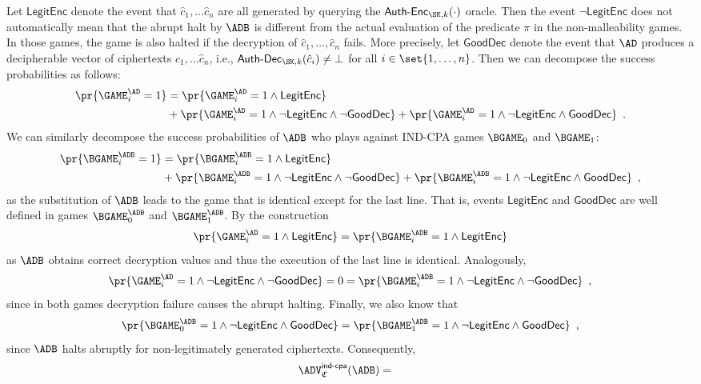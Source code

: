 \documentclass{crypto-exercise}
\newcommand{\CS}{\mathfrak{C}}
\newcommand{\AENC}{\mathsf{Auth\text{-}Enc}}
\newcommand{\ADEC}{\mathsf{Auth\text{-}Dec}}
\newcommand{\LENC}{\mathsf{LegitEnc}}
\newcommand{\GDEC}{\mathsf{GoodDec}}
\begin{document}
\begin{solution}
Let $\LENC$ denote the  event that  $\hat{c}_1,\ldots\hat{c}_n$ are all generated by querying the $\AENC_{\SK,k}(\cdot)$ oracle. Then the event $\neg\LENC$ does not automatically mean that the abrupt halt by $\ADB$ is different from the actual evaluation of the predicate $\pi$ in the non-malleability games. In those games, the game is also halted if the decryption of $\hat{c}_1,\ldots,\hat{c}_n$ fails. More precisely, let $\GDEC$ denote the event that $\AD$ produces a decipherable vector of ciphertexts $\hat{c}_1,\ldots\hat{c}_n$, i.e., $\ADEC_{\SK,k}(\hat{c}_i)\neq \bot$ for all $i\in\set{1,\ldots,n}$. Then
we can decompose the success probabilities as follows:
\begin{align*}
\pr{\GAME_i^\AD=1}&=\pr{\GAME_i^\AD=1\wedge\LENC}\\
&+
\pr{\GAME_i^\AD=1\wedge\neg\LENC\wedge\neg\GDEC}+
\pr{\GAME_i^\AD=1\wedge\neg\LENC\wedge\GDEC}\enspace.
\end{align*} 
We can similarly decompose the success probabilities of $\ADB$ who plays against IND-CPA games $\BGAME_0$ and $\BGAME_1$:
\begin{align*}
\pr{\BGAME_i^\ADB=1}&=\pr{\BGAME_i^\ADB=1\wedge\LENC}\\
&+
\pr{\BGAME_i^\ADB=1\wedge\neg\LENC\wedge\neg\GDEC}+
\pr{\BGAME_i^\ADB=1\wedge\neg\LENC\wedge\GDEC}\enspace,
\end{align*} 
as the substitution of $\ADB$ leads to the game that is identical except for the last line. That is, events $\LENC$ and $\GDEC$ are well defined in games $\BGAME_0^\ADB$ and $\BGAME_1^\ADB$. By the construction
\begin{align*}
\pr{\GAME_i^\AD=1\wedge\LENC}=\pr{\BGAME_i^\ADB=1\wedge\LENC}
\end{align*} 
as $\ADB$ obtains correct decryption values and thus the execution of the last line is identical. Analogously, 
\begin{align*}
\pr{\GAME_i^\AD=1\wedge\neg\LENC\wedge\neg\GDEC}= 0 =
\pr{\BGAME_i^\ADB=1\wedge\neg\LENC\wedge\neg\GDEC}\enspace, 
\end{align*}
since in both games decryption failure causes the abrupt halting. Finally, we also know that   
\begin{align*}
\pr{\BGAME_0^\ADB=1\wedge\neg\LENC\wedge\GDEC}=\pr{\BGAME_1^\ADB=1\wedge\neg\LENC\wedge\GDEC}\enspace, 
\end{align*}
since $\ADB$ halts abruptly for non-legitimately generated ciphertexts. Consequently,
\begin{align*}
\ADVINDCPA{\CS}{\ADB}&=

\end{align*}
\end{solution}
\end{document}
